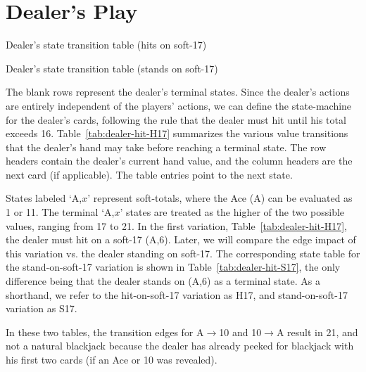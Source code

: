 \section{Dealer's Play}
\label{sec:rules:dealer-play}

\begin{table}[ht!]
\caption{Dealer's state transition table (hits on soft-17)}
\begin{center}

\end{center}
\label{tab:dealer-hit-H17}
\end{table}

\begin{table}[ht!]
\caption{Dealer's state transition table (stands on soft-17)}
\begin{center}

\end{center}
\label{tab:dealer-hit-S17}
\end{table}

The blank rows represent the dealer's terminal states.
Since the dealer's actions are entirely independent of 
the players' actions, we can define the state-machine
for the dealer's cards, following the rule that the dealer
must hit until his total exceeds 16.
Table~\ref{tab:dealer-hit-H17} summarizes the various
value transitions that the dealer's hand may take
before reaching a terminal state.
The row headers contain the dealer's current hand value, 
and the column headers are the next card (if applicable).
The table entries point to the next state.

States labeled `A,$x$' represent soft-totals, where the Ace (A)
can be evaluated as 1 or 11.  
The terminal `A,$x$' states are treated as the higher of the 
two possible values, ranging from 17 to 21.  
In the first variation, Table~\ref{tab:dealer-hit-H17}, 
the dealer must hit on a soft-17 (A,6).
Later, we will compare the edge impact of this variation
vs. the dealer standing on soft-17.
The corresponding state table for the stand-on-soft-17 variation
is shown in Table~\ref{tab:dealer-hit-S17}, 
the only difference being that the dealer stands on (A,6) 
as a terminal state.
As a shorthand, we refer to the hit-on-soft-17 variation as H17, 
and stand-on-soft-17 variation as S17.

In these two tables, the transition edges for A$\rightarrow$10
and 10$\rightarrow$A result in 21, and not a natural blackjack
because the dealer has already peeked for blackjack
with his first two cards (if an Ace or 10 was revealed).

